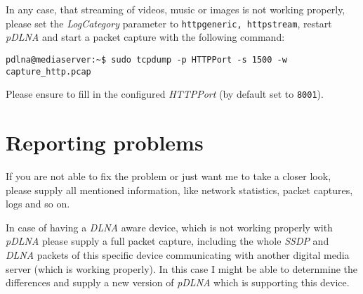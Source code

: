In any case, that streaming of videos, music or images is not working properly, please set the {\em LogCategory} parameter to \verb|httpgeneric, httpstream|, restart {\em pDLNA} and start a packet capture with the following command:
\begin{lstlisting}
pdlna@mediaserver:~$ sudo tcpdump -p HTTPPort -s 1500 -w capture_http.pcap
\end{lstlisting}
Please ensure to fill in the configured {\em HTTPPort} (by default set to \verb|8001|).

\section{Reporting problems}

If you are not able to fix the problem or just want me to take a closer look, please supply all mentioned information, like network statistics, packet captures, logs and so on.

In case of having a {\em DLNA} aware device, which is not working properly with {\em pDLNA} please supply a full packet capture, including the whole {\em SSDP} and {\em DLNA} packets of this specific device communicating with another digital media server (which is working properly). In this case I might be able to deternmine the differences and supply a new version of {\em pDLNA} which is supporting this device.